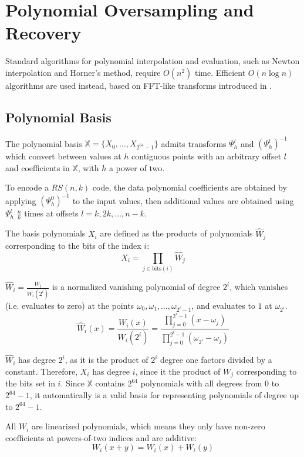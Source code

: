 \chapter{Polynomial Oversampling and Recovery}

Standard algorithms for polynomial interpolation and evaluation, such as Newton interpolation and Horner's method, require $O(n^2)$ time.
Efficient $O(n \log n)$ algorithms are used instead, based on FFT-like transforms introduced in \cite{novel-poly}.

\section{Polynomial Basis}

The polynomial basis $\mathbb{X} = \{X_0, \ldots, X_{2^{64} - 1}\}$ admits transforms $\Psi_h^l$ and $(\Psi_h^l)^{-1}$ which convert between values at $h$ contiguous points with an arbitrary offset $l$ and coefficients in $\mathbb{X}$, with $h$ a power of two.

To encode a $RS(n, k)$ code, the data polynomial coefficients are obtained by applying $(\Psi_h^0)^{-1}$ to the input values, then additional values are obtained using $\Psi_h^l$ $\frac{n}{k}$ times at offsets $l = k, 2k, \ldots, n - k$.

The basis polynomials $X_i$ are defined as the products of polynomials $\hat{W}_j$ corresponding to the bits of the index $i$:
\[X_i = \prod_{j \in \text{bits}(i)} \hat{W}_j\]

$\hat{W}_i = \frac{W_i}{W_i(2^{i})}$ is a normalized vanishing polynomial of degree $2^{i}$, which vanishes (i.e. evaluates to zero) at the points $\omega_0, \omega_1, \ldots, \omega_{2^{i} - 1}$, and evaluates to $1$ at $\omega_{2^{i}}$.
\[\hat{W}_i(x) = \frac{W_i(x)}{W_i(2^{i})} = \frac{\prod_{j = 0}^{2^i - 1} (x - \omega_j)}{\prod_{j = 0}^{2^i - 1} (\omega_{2^i} - \omega_j)}\]

$\hat{W}_i$ has degree $2^{i}$, as it is the product of $2^{i}$ degree one factors divided by a constant. Therefore, $X_i$ has degree $i$, since it the product of $W_j$ corresponding to the bits set in $i$.
Since $\mathbb{X}$ contains $2^{64}$ polynomials with all degrees from $0$ to $2^{64} - 1$, it automatically is a valid basis for representing polynomials of degree up to $2^{64} - 1$.

All $W_i$ are linearized polynomials, which means they only have non-zero coefficients at powers-of-two indices and are additive:
\[W_i(x + y) = W_i(x) + W_i(y)\]

